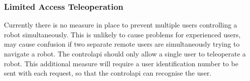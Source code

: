 \subsubsection{Limited Access Teleoperation}
\label{sec:web_future_work_access_tele}
Currently there is no measure in place to prevent multiple users controlling a robot simultaneously. This is unlikely to cause problems for experienced users, may cause confusion if two separate remote users are simultaneously trying to navigate a robot.
\newline
The \gls{controlapi} should only allow a single user to teleoperate a robot. This additional measure will require a user identification number to be sent with each request, so that the \gls{controlapi} can recognise the user.


